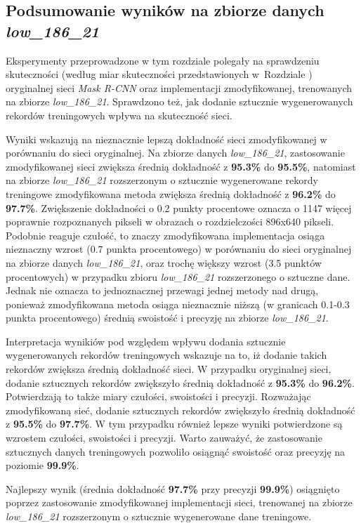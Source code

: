 \subsection{Podsumowanie wyników na zbiorze danych \textit{low\_186\_21}}
Eksperymenty przeprowadzone w tym rozdziale polegały na sprawdzeniu skuteczności (według miar skuteczności przedstawionych w~Rozdziale ) oryginalnej sieci \textit{Mask R-CNN} oraz implementacji zmodyfikowanej, trenowanych na zbiorze \textit{low\_186\_21}.
Sprawdzono też, jak dodanie sztucznie wygenerowanych rekordów treningowych wpływa na skuteczność sieci.


Wyniki wskazują na nieznacznie lepszą dokładność sieci zmodyfikowanej w porównaniu do sieci oryginalnej.
Na zbiorze danych \textit{low\_186\_21}, zastosowanie zmodyfikowanej sieci zwiększa średnią dokładność z \textbf{95.3\%} do \textbf{95.5\%}, natomiast na zbiorze \textit{low\_186\_21} rozszerzonym o sztucznie wygenerowane rekordy treningowe zmodyfikowana metoda zwiększa średnią dokładność z \textbf{96.2\%} do \textbf{97.7\%}. Zwiększenie dokładności o 0.2 punkty procentowe oznacza o 1147 więcej poprawnie rozpoznanych pikseli w obrazach o rozdzielczości 896x640 pikseli.
Podobnie reaguje czułość, to znaczy zmodyfikowana implementacja osiąga nieznaczny wzrost (0.7 punkta procentowego) w porównaniu do sieci oryginalnej na zbiorze danych \textit{low\_186\_21}, oraz trochę większy wzrost (3.5 punktów procentowych) w przypadku zbioru \textit{low\_186\_21} rozszerzonego o sztuczne dane. Jednak nie oznacza to jednoznacznej przewagi jednej metody nad drugą, ponieważ zmodyfikowana metoda osiąga nieznacznie niższą (w granicach 0.1-0.3 punkta procentowego) średnią swoistość i precyzję na zbiorze \textit{low\_186\_21}.


Interpretacja wynikiów pod względem wpływu dodania sztucznie wygenerowanych rekordów treningowych wskazuje na to, iż dodanie takich rekordów zwiększa średnią dokładność sieci. W przypadku oryginalnej sieci, dodanie sztucznych rekordów zwiększyło średnią dokładność z \textbf{95.3\%} do \textbf{96.2\%}. Potwierdzają to także miary czułości, swoistości i precyzji. Rozważając zmodyfikowaną sieć, dodanie sztucznych rekordów zwiększyło średnią dokładność z \textbf{95.5\%} do \textbf{97.7\%}. W tym przypadku również lepsze wyniki potwierdzone są wzrostem czułości, swoistości i precyzji. Warto zauważyć, że zastosowanie sztucznych danych treningowych pozwoliło osiągnąć swoistość oraz precyzję na poziomie \textbf{99.9\%}.


Najlepszy wynik (średnia dokładność \textbf{97.7\%} przy precyzji \textbf{99.9\%}) osiągnięto poprzez zastosowanie zmodyfikowanej implementacji sieci, trenowanej na zbiorze \textit{low\_186\_21} rozszerzonym o sztucznie wygenerowane dane treningowe.